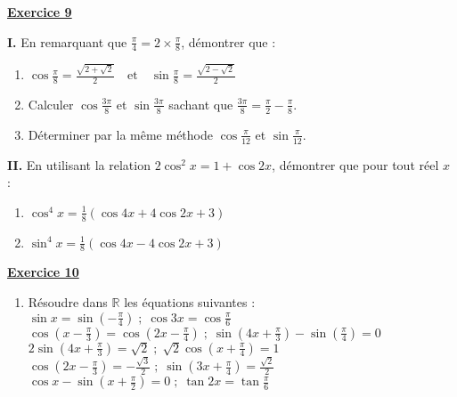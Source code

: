 \documentclass[12pt,a4paper]{article}
\begin{document}
\begin{multicols}{2}
\textbf{\underline{Exercice 9}}

\textbf{I.} En remarquant que \( \frac{\pi}{4} = 2 \times \frac{\pi}{8} \), démontrer que :

\begin{enumerate}
    \item \( \cos \frac{\pi}{8} = \frac{\sqrt{2 + \sqrt{2}}}{2} \quad \text{et} \quad \sin \frac{\pi}{8} = \frac{\sqrt{2 - \sqrt{2}}}{2} \)

    \item Calculer \( \cos \frac{3\pi}{8} \) et \( \sin \frac{3\pi}{8} \) sachant que \( \frac{3\pi}{8} = \frac{\pi}{2} - \frac{\pi}{8} \).

    \item Déterminer par la même méthode \( \cos \frac{\pi}{12} \) et \( \sin \frac{\pi}{12} \).
\end{enumerate}

\textbf{II.} En utilisant la relation \( 2 \cos^2 x = 1 + \cos 2x \), démontrer que pour tout réel \( x \) :

\begin{enumerate}
    \item \( \cos^4 x = \frac{1}{8}(\cos 4x + 4 \cos 2x + 3) \)

    \item \( \sin^4 x = \frac{1}{8}(\cos 4x - 4 \cos 2x + 3) \)
\end{enumerate}
\textbf{\underline{Exercice 10}}
\begin{enumerate}
    \item Résoudre dans \( \mathbb{R} \) les équations suivantes :\\
    \( \sin x = \sin\left( -\frac{\pi}{4} \right) \;;\; \cos 3x = \cos \frac{\pi}{6} \)\\
    \( \cos\left( x - \frac{\pi}{3} \right) = \cos\left( 2x - \frac{\pi}{4} \right) \;;\; \sin\left( 4x + \frac{\pi}{3} \right) - \sin\left( \frac{\pi}{4} \right) = 0 \)\\
    \( 2 \sin\left( 4x + \frac{\pi}{3} \right) = \sqrt{2} \;;\; \sqrt{2} \cos\left( x + \frac{\pi}{4} \right) = 1 \)\\
    \( \cos\left( 2x - \frac{\pi}{3} \right) = -\frac{\sqrt{3}}{2} \;;\; \sin\left( 3x + \frac{\pi}{4} \right) = \frac{\sqrt{2}}{2} \)\\
    \( \cos x - \sin\left( x + \frac{\pi}{2} \right) = 0 \;;\; \tan 2x = \tan \frac{\pi}{6} \)


\end{enumerate}
\end{multicols}
\end{document}
